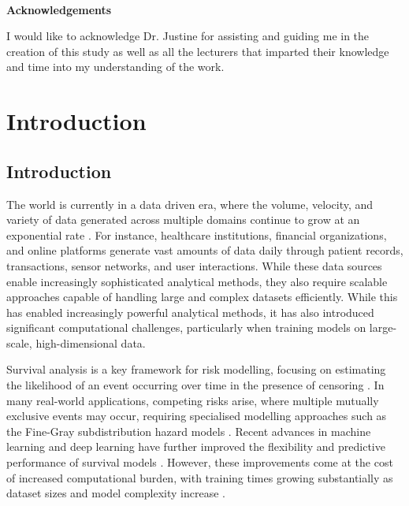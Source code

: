 \documentclass[a4paper,twoside,12pt]{report}
\newenvironment{acknowledgements}{\ \vfill\begin{center}\textbf{Acknowledgements}\end{center}\addcontentsline{toc}{section}{Acknowledgements}}{\vfill\vfill\newpage}
\begin{document}
\begin{acknowledgements}
I would like to acknowledge Dr. Justine for assisting and guiding me in the creation of this study as well as all the lecturers that imparted their knowledge and time into my understanding of the work.
\end{acknowledgements}


{}
\tableofcontents
\newpage
{}
{}

\chapter{Introduction}
\section{Introduction}
The world is currently in a data driven era, where the volume, velocity, and variety of data generated across multiple domains continue to grow at an exponential rate \citep{Laney2001}. For instance, healthcare institutions, financial organizations, and online platforms generate vast amounts of data daily through patient records, transactions, sensor networks, and user interactions. While these data sources enable increasingly sophisticated analytical methods, they also require scalable approaches capable of handling large and complex datasets efficiently. While this has enabled increasingly powerful analytical methods, it has also introduced significant computational challenges, particularly when training models on large-scale, high-dimensional data.

Survival analysis is a key framework for risk modelling, focusing on estimating the likelihood of an event occurring over time in the presence of censoring \citep{Cox1972}. In many real-world applications, competing risks arise, where multiple mutually exclusive events may occur, requiring specialised modelling approaches such as the Fine-Gray subdistribution hazard models \citep{FineGray1999}. Recent advances in machine learning and deep learning have further improved the flexibility and predictive performance of survival models \citep{LeCun2015,Katzman2018,Lee2018}. However, these improvements come at the cost of increased computational burden, with training times growing substantially as dataset sizes and model complexity increase \citep{Wang2020}.
\end{document}

